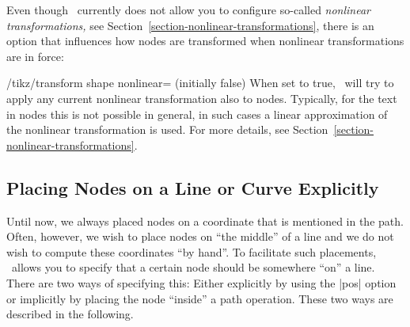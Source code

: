 Even though \tikzname\ currently does not allow you to configure so-called
\emph{nonlinear transformations,} see
Section~\ref{section-nonlinear-transformations}, there is an option that
influences how nodes are transformed when nonlinear transformations are in
force:
%
\begin{key}{/tikz/transform shape nonlinear=  (initially false)}
    When set to true, \tikzname\ will try to apply any current nonlinear
    transformation also to nodes. Typically, for the text in nodes this is not
    possible in general, in such cases a linear approximation of the nonlinear
    transformation is used. For more details, see
    Section~\ref{section-nonlinear-transformations}.
\makeatletter
\begin{codeexample}[
    preamble={\usepgfmodule{nonlineartransformations}\usetikzlibrary{curvilinear}},
    pre={\makeatletter},
]
\end{codeexample}
\end{key}


\subsection{Placing Nodes on a Line or Curve Explicitly}
\label{section-nodes-placing-1}

Until now, we always placed nodes on a coordinate that is mentioned in the path.
Often, however, we wish to place nodes on ``the middle'' of a line and we do
not wish to compute these coordinates ``by hand''. To facilitate such
placements, \tikzname\ allows you to specify that a certain node should be
somewhere ``on'' a line. There are two ways of specifying this: Either
explicitly by using the |pos| option or implicitly by placing the node
``inside'' a path operation. These two ways are described in the following.

